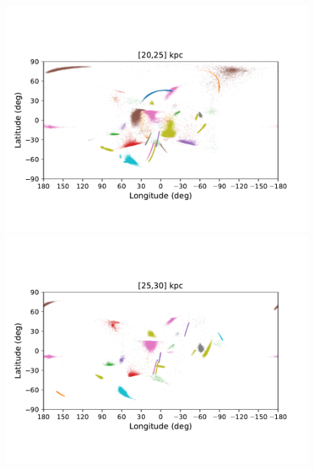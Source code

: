     \twocolumn
    \begin{figure}[h!]
        \begin{center}
            \includegraphics[clip=true, trim = 0mm 15mm 0mm 20mm, width=\columnwidth]{images/PII_ensemble_LB_D20-25_scatter.pdf}
            \includegraphics[clip=true, trim = 0mm 15mm 0mm 20mm, width=\columnwidth]{images/PII_ensemble_LB_D25-30_scatter.pdf}


\end{center}
\end{figure}
